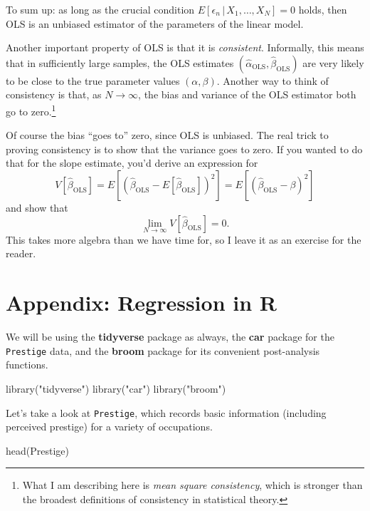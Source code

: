 \documentclass[
  12pt,
  oneside,openany]{book}
\newenvironment{Shaded}{\begin{snugshade}}{\end{snugshade}}
\newcommand{\FunctionTok}[1]{\textcolor[rgb]{0.00,0.00,0.00}{#1}}
\newcommand{\NormalTok}[1]{#1}
\newcommand{\StringTok}[1]{\textcolor[rgb]{0.31,0.60,0.02}{#1}}
\begin{document}
To sum up: as long as the crucial condition \(E[\epsilon_n \,|\, X_1, \ldots, X_N] = 0\) holds, then OLS is an unbiased estimator of the parameters of the linear model.

Another important property of OLS is that it is \emph{consistent}. Informally, this means that in sufficiently large samples, the OLS estimates \((\hat{\alpha}_{\text{OLS}}, \hat{\beta}_{\text{OLS}})\) are very likely to be close to the true parameter values \((\alpha, \beta)\). Another way to think of consistency is that, as \(N \to \infty\), the bias and variance of the OLS estimator both go to zero.\footnote{What I am describing here is \emph{mean square consistency}, which is stronger than the broadest definitions of consistency in statistical theory.}

Of course the bias ``goes to'' zero, since OLS is unbiased. The real trick to proving consistency is to show that the variance goes to zero. If you wanted to do that for the slope estimate, you'd derive an expression for
\[
V[\hat{\beta}_{\text{OLS}}]
=
E[(\hat{\beta}_{\text{OLS}} - E[\hat{\beta}_{\text{OLS}}])^2]
=
E[(\hat{\beta}_{\text{OLS}} - \beta)^2]
\]
and show that
\[
\lim_{N \to \infty} V[\hat{\beta}_{\text{OLS}}] = 0.
\]
This takes more algebra than we have time for, so I leave it as an exercise for the reader.

\hypertarget{appendix-regression-in-r}{%
\section{Appendix: Regression in R}\label{appendix-regression-in-r}}

We will be using the \textbf{tidyverse} package as always, the \textbf{car} package for the \texttt{Prestige} data, and the \textbf{broom} package for its convenient post-analysis functions.

\begin{Shaded}
\begin{Highlighting}[]
\FunctionTok{library}\NormalTok{(}\StringTok{"tidyverse"}\NormalTok{)}
\FunctionTok{library}\NormalTok{(}\StringTok{"car"}\NormalTok{)}
\FunctionTok{library}\NormalTok{(}\StringTok{"broom"}\NormalTok{)}
\end{Highlighting}
\end{Shaded}

Let's take a look at \texttt{Prestige}, which records basic information (including perceived prestige) for a variety of occupations.

\begin{Shaded}
\begin{Highlighting}[]
\FunctionTok{head}\NormalTok{(Prestige)}
\end{Highlighting}
\end{Shaded}
\end{document}

